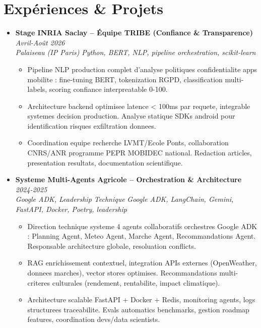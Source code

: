 \documentclass[a4paper,11pt]{article}
\begin{document}
\section{Exp\'eriences \& Projets}
\begin{itemize}[leftmargin=*, label={-}]

\item \textbf{Stage INRIA Saclay -- \'Equipe TRIBE (Confiance \& Transparence)} \hfill \textit{Avril-Ao\^ut 2026} \\
\textit{Palaiseau (IP Paris)} \hfill \textit{Python, BERT, NLP, pipeline orchestration, scikit-learn}
\vspace{-2pt}
    \begin{itemize}[leftmargin=0.4cm, nosep, label=\tiny$\bullet$]
        \item \small{Pipeline NLP production complet d'analyse politiques confidentialite apps mobilite : fine-tuning BERT, tokenization RGPD, classification multi-labels, scoring confiance interpreatable 0-100.}
        \item \small{Architecture backend optimisee latence < 100ms par requete, integrable systemes decision production. Analyse statique SDKs android pour identification risques exfiltration donnees.}
        \item \small{Coordination equipe recherche LVMT/Ecole Ponts, collaboration CNRS/ANR programme PEPR MOBIDEC national. Redaction articles, presentation resultats, documentation scientifique.}
    \end{itemize}
\vspace{3pt}

\item \textbf{Systeme Multi-Agents Agricole -- Orchestration \& Architecture} \hfill \textit{2024-2025} \\
\textit{Google ADK, Leadership Technique} \hfill \textit{Google ADK, LangChain, Gemini, FastAPI, Docker, Poetry, leadership}
\vspace{-2pt}
    \begin{itemize}[leftmargin=0.4cm, nosep, label=\tiny$\bullet$]
        \item \small{Direction technique systeme 4 agents collaboratifs orchestres Google ADK : Planning Agent, Meteo Agent, Marche Agent, Recommandations Agent. Responsable architecture globale, resoluation conflicts.}
        \item \small{RAG enrichissement contextuel, integration APIs externes (OpenWeather, donnees marches), vector stores optimises. Recommandations multi-criteres culturales (rendement, rentabilite, impact climatique).}
        \item \small{Architecture scalable FastAPI + Docker + Redis, monitoring agents, logs structurees traceabilite. Evals automatics benchmarks, gestion roadmap features, coordination devs/data scientists.}
    \end{itemize}
\vspace{3pt}


\end{itemize}
\end{document}

